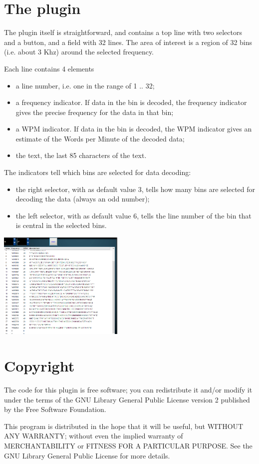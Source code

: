 \documentclass[10pt]{article}
\begin{document}
\section{The plugin}
The plugin itself is straightforward, and contains a top line with two
selectors and a button, and a field with 32 lines.
The area of interest is a region of 32 bins (i.e. about 3 Khz)
around the selected frequency.
\par
Each line contains 4 elements
\begin{itemize}
\item a line number, i.e. one in the range of 1 .. 32;
\item a frequency indicator. If data in the bin is decoded, the
frequency indicator gives the precise frequency for the data in that bin;
\item a WPM indicator. If data in the bin is decoded, the
WPM indicator gives an estimate of the Words per Minute of the decoded data;
\item the text, the last 85 characters of the text.
\end{itemize}
The indicators tell which bins are selected for data decoding:
\begin{itemize}
\item the right selector, with as default value 3, tells how many bins
are selected for decoding the data (always an odd number);
\item the left selector, with as default value 6, tells the line number
of the bin that is central in the selected bins.
\end{itemize}
\includegraphics[width=60mm]{skimmer-2.png}
\section{Copyright}
The code for this plugin is free software; you can redistribute
it and/or modify it under the terms of the GNU Library General Public
License version 2 published by the Free Software Foundation.
\par
This program is distributed in the hope that it will be useful,
but WITHOUT ANY WARRANTY; without even the implied warranty of
MERCHANTABILITY or FITNESS FOR A PARTICULAR PURPOSE.  See the
GNU Library General Public License for more details.
\end{document}

